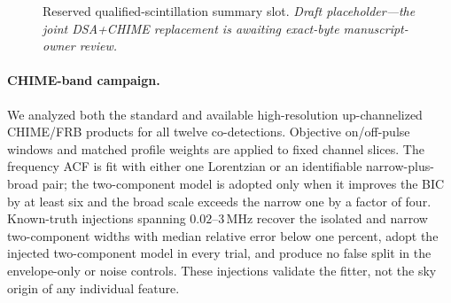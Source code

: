 \begin{figure}
    \centering
    \caption{Reserved qualified-scintillation summary slot. \emph{Draft
    placeholder---the joint DSA+CHIME replacement is awaiting exact-byte
    manuscript-owner review.}}
    \label{fig:scint-qualified-summary}
\end{figure}

\paragraph{CHIME-band campaign.} We analyzed both the standard and available
high-resolution up-channelized CHIME/FRB products for all twelve
co-detections. Objective on/off-pulse windows and matched profile weights are
applied to fixed channel slices. The frequency ACF is fit with either one
Lorentzian or an identifiable narrow-plus-broad pair; the two-component model
is adopted only when it improves the BIC by at least six and the broad scale
exceeds the narrow one by a factor of four. Known-truth injections spanning
$0.02$--$3\,$MHz recover the isolated and narrow two-component widths with
median relative error below one percent, adopt the injected two-component
model in every trial, and produce no false split in the envelope-only or
noise controls. These injections validate the fitter, not the sky origin of
any individual feature.

